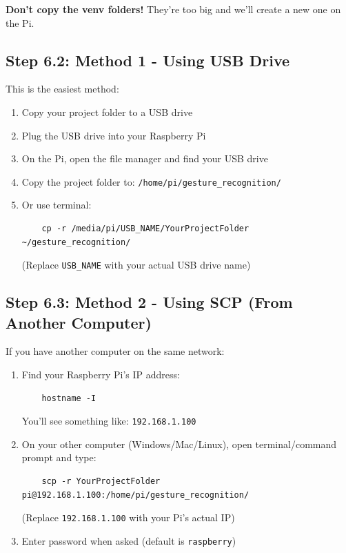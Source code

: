 \documentclass[12pt,a4paper]{article}
\begin{document}
\begin{warningbox}
\textbf{Don't copy the venv folders!} They're too big and we'll create a new one on the Pi.
\end{warningbox}

\subsection{Step 6.2: Method 1 - Using USB Drive}

This is the easiest method:

\begin{enumerate}
    \item Copy your project folder to a USB drive
    \item Plug the USB drive into your Raspberry Pi
    \item On the Pi, open the file manager and find your USB drive
    \item Copy the project folder to: \texttt{/home/pi/gesture\_recognition/}
    \item Or use terminal:
    \begin{lstlisting}
    cp -r /media/pi/USB_NAME/YourProjectFolder ~/gesture_recognition/
    \end{lstlisting}
    (Replace \texttt{USB\_NAME} with your actual USB drive name)
\end{enumerate}

\subsection{Step 6.3: Method 2 - Using SCP (From Another Computer)}

If you have another computer on the same network:

\begin{enumerate}
    \item Find your Raspberry Pi's IP address:
    \begin{lstlisting}
    hostname -I
    \end{lstlisting}
    You'll see something like: \texttt{192.168.1.100}
    
    \item On your other computer (Windows/Mac/Linux), open terminal/command prompt and type:
    \begin{lstlisting}
    scp -r YourProjectFolder pi@192.168.1.100:/home/pi/gesture_recognition/
    \end{lstlisting}
    (Replace \texttt{192.168.1.100} with your Pi's actual IP)
    
    \item Enter password when asked (default is \texttt{raspberry})
\end{enumerate}
\end{document}
